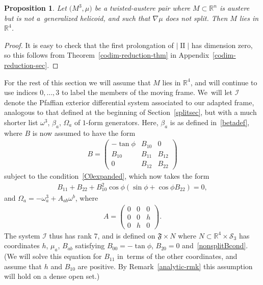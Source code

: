 \documentclass[10pt,a4paper]{amsart}
\def\R{\mathbb{R}}
\def\II{\operatorname{II}} %
\def\calS{\mathcal{S}}
\def\F{\mathfrak{F}}
\def\calI{\mathcal{I}}
\def\w{\omega}
\newtheorem{Proposition}[Theorem]{Proposition}
\numberwithin{equation}{section}
\begin{document}
\begin{Proposition} \label{non-split-prelim}
Let $\big(M^3,\mu\big)$ be a twisted-austere pair where $M \subset \R^n$ is austere but is not a~generalized helicoid, and such that $\nabla \mu$ does not split. Then $M$ lies in $\R^4$.
\end{Proposition}
\begin{proof}
It is easy to check that the first prolongation of $|\II|$ has dimension zero, so this follows from Theorem~\ref{codim-reduction-thm} in Appendix~\ref{codim-reduction-sec}.
\end{proof}

For the rest of this section we will assume that $M$ lies in $\R^4$, and will continue to use indices $0, \dots, 3$ to label the members of the moving frame. We~will let $\calI$ denote the Pfaffian exterior differential system associated to our adapted frame, analogous to that defined at the beginning of Section~\ref{splitsec}, but with a much shorter list $\w^3$, $\beta_a$, $\Omega_a$ of $1$-form generators. Here, $\beta_a$ is as defined in~\eqref{betadef}, where $B$ is now assumed to have the form
\begin{gather*}
B=\begin{pmatrix} -\tan \phi & B_{10} & 0 \\ B_{10} & B_{11} & B_{12} \\ 0 & B_{12} & B_{22} \end{pmatrix}
\end{gather*}
subject to the condition~\eqref{C0expanded}, which now takes the form
\begin{gather} \label{nonsplitBcond}
B_{11}+B_{22} + B_{10}^2 \cos\phi (\sin\phi + \cos\phi B_{22})=0,
\end{gather}
and $\Omega_a = -\w^3_a + A_{ab} \w^b$, where
\begin{gather*}
A=\begin{pmatrix} 0 & 0 & 0 \\ 0 & 0 & h \\ 0 & h & 0 \end{pmatrix} .
\end{gather*}
The system $\calI$ thus has rank 7, and is defined on $\F \times N$ where $N \subset \R^4 \times \calS_3$ has coordinates $h$, $\mu_a$, $B_{ab}$ satisfying
$B_{00}=-\tan\phi$, $B_{20}=0$ and~\eqref{nonsplitBcond}. (We will solve this equation for $B_{11}$ in~terms of the other coordinates, and assume that $h$ and $B_{10}$ are positive. By Remark~\ref{analytic-rmk} this assumption will hold on a dense open set.)
\end{document}
